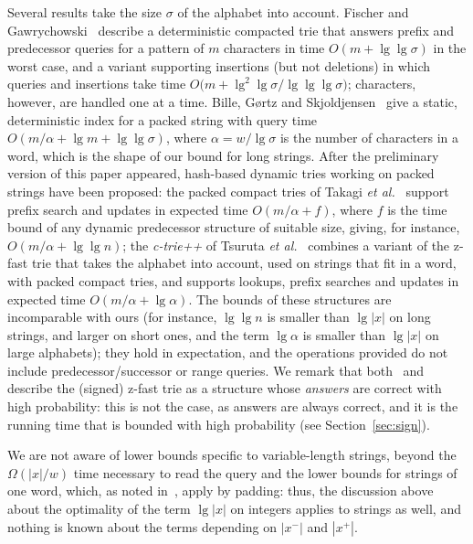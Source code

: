 \documentclass[a4paper]{article}
\newcommand{\?}{\mskip1.5mu}
\begin{document}
Several results take the size $\sigma$ of the alphabet into account. Fischer and Gawrychowski~\cite{Fischer2015Alphabet} 
describe a deterministic compacted trie that answers prefix and predecessor queries for a pattern of $m$ characters in time $O(m+\lg\lg\sigma)$
in the worst case, and a variant supporting insertions (but not deletions) in which queries and insertions 
take time $O\bigl(m+\lg^2\lg\sigma/\lg\lg\lg\sigma\bigr)$; characters, however, are handled one at a time. 
Bille, G{\o}rtz and Skjoldjensen~\cite{Bille2017Deterministic} give a static, deterministic index for a packed string
with query time $O(m/\alpha+\lg m+\lg\lg\sigma)$, where $\alpha=w/\lg\sigma$ is the number of characters in a word, which is the shape of 
our bound for long strings. After the preliminary version of this paper appeared, hash-based dynamic tries working on packed strings have been proposed: 
the packed compact tries of Takagi \textit{et al.}~\cite{Takagi2017Packed} support prefix search and updates in expected time $O(m/\alpha+f)$, 
where $f$ is the time bound of any dynamic predecessor structure of suitable size, giving, for instance, $O(m/\alpha+\lg\lg n)$; the \textit{c-trie++} of 
Tsuruta \textit{et al.}~\cite{TKKctriepp} combines a variant of the z-fast trie that takes the alphabet into account, used on strings that fit in a word, 
with packed compact tries, and supports lookups, prefix searches and updates in expected time $O(m/\alpha+\lg\alpha)$. 
The bounds of these structures are incomparable with ours (for instance, $\lg\lg n$ is smaller than $\lg|x|$ on long strings, and larger on short ones, 
and the term $\lg\alpha$ is smaller than $\lg|x|$ on large alphabets); they hold in expectation, 
and the operations provided do not include predecessor/successor or range queries. 
We remark that both~\cite{Takagi2017Packed} and~\cite{Eppstein2025Ziptries} describe the (signed) z-fast trie as a structure whose \emph{answers} are correct with high probability: 
this is not the case, as answers are always correct, and it is the running time that is bounded with high probability (see Section~\ref{sec:sign}).

We are not aware of lower bounds specific to variable-length strings, beyond the $\Omega(|x|/w)$ time 
necessary to read the query and the lower bounds for strings of one word, which, as noted in~\cite{AnTDOSEST}, apply by padding: 
thus, the discussion above about the optimality of the term $\lg|x|$ on integers applies to strings as well, 
and nothing is known about the terms depending on $|x^-|$ and $|x^+|$.
\end{document}
